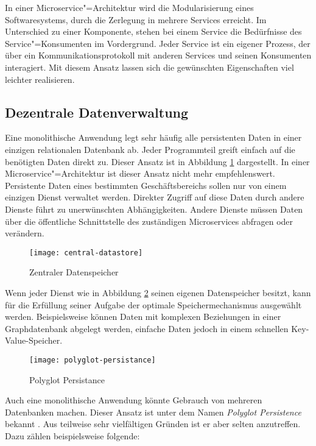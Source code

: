 In einer Microservice"=Architektur wird die Modularisierung eines Softwaresystems, durch die Zerlegung in mehrere Services erreicht. Im Unterschied zu einer Komponente, stehen bei einem Service die Bedürfnisse des Service"=Konsumenten im Vordergrund. Jeder Service ist ein eigener Prozess, der über ein Kommunikationsprotokoll mit anderen Services und seinen Konsumenten interagiert. Mit diesem Ansatz lassen sich die gewünschten Eigenschaften viel leichter realisieren.

\subsection{Dezentrale Datenverwaltung}

Eine monolithische Anwendung legt sehr häufig alle persistenten Daten in einer einzigen relationalen Datenbank ab. Jeder Programmteil greift einfach auf die benötigten Daten direkt zu. Dieser Ansatz ist in Abbildung \ref{fig:central-datastore} dargestellt. In einer Microservice"=Architektur ist dieser Ansatz nicht mehr empfehlenswert. Persistente Daten eines bestimmten Geschäftsbereichs sollen nur von einem einzigen Dienst verwaltet werden. Direkter Zugriff auf diese Daten durch andere Dienste führt zu unerwünschten Abhängigkeiten. Andere Dienste müssen Daten über die öffentliche Schnittstelle des zuständigen Microservices abfragen oder verändern.

\begin{figure}[h]
  \centering
	\texttt{[image: central-datastore]}
	\caption{Zentraler Datenspeicher}
	\label{fig:central-datastore}
\end{figure}

Wenn jeder Dienst wie in Abbildung \ref{fig:polyglot-persistnace} seinen eigenen Datenspeicher besitzt, kann für die Erfüllung seiner Aufgabe der optimale Speichermechanismus ausgewählt werden. Beispielsweise können Daten mit komplexen Beziehungen in einer Graphdatenbank abgelegt werden, einfache Daten jedoch in einem schnellen Key-Value-Speicher.

\begin{figure}[h]
  \centering
	\texttt{[image: polyglot-persistance]}
	\caption{Polyglot Persistance}
	\label{fig:polyglot-persistnace}
\end{figure}

Auch eine monolithische Anwendung könnte Gebrauch von mehreren Datenbanken machen. Dieser Ansatz ist unter dem Namen \textit{Polyglot Persistence} bekannt \cite{FowlerPP}. Aus teilweise sehr vielfältigen Gründen ist er aber selten anzutreffen. Dazu zählen beispielsweise folgende:

